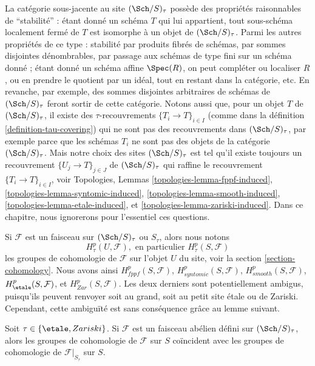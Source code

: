 \noindent
La cat\'egorie sous-jacente au site $(\Sch/S)_\tau$ poss\`ede des propri\'et\'es
raisonnables de ``stabilit\'e'' : \'etant donn\'e un sch\'ema $T$ qui lui appartient, tout sous-sch\'ema
localement ferm\'e de $T$ est isomorphe \`a un objet de $(\Sch/S)_\tau$.
Parmi les autres propri\'et\'es de ce type : stabilit\'e par produits fibr\'es de sch\'emas,
par sommes disjointes d\'enombrables,
par passage aux sch\'emas de type fini sur un sch\'ema donn\'e ; \'etant donn\'e un sch\'ema affine
$\Spec(R)$, on peut compl\'eter ou localiser $R$, ou en prendre le quotient
par un id\'eal, tout en restant dans la cat\'egorie, etc.
En revanche, par exemple, des sommes disjointes arbitraires
de sch\'emas de $(\Sch/S)_\tau$ feront sortir de cette cat\'egorie.
Notons aussi que, pour un objet $T$ de $(\Sch/S)_\tau$, il existe des
$\tau$-recouvrements $\{T_i \to T\}_{i \in I}$ (comme dans la
d\'efinition \ref{definition-tau-covering})
qui ne sont pas des recouvrements dans $(\Sch/S)_\tau$, par exemple
parce que les sch\'emas $T_i$ ne sont pas des objets de la cat\'egorie
$(\Sch/S)_\tau$. Mais notre choix des sites $(\Sch/S)_\tau$
est tel qu'il existe toujours
un recouvrement $\{U_j \to T\}_{j \in J}$ de $(\Sch/S)_\tau$ qui raffine
le recouvrement $\{T_i \to T\}_{i \in I}$, voir
Topologies, Lemmas
\ref{topologies-lemma-fppf-induced},
\ref{topologies-lemma-syntomic-induced},
\ref{topologies-lemma-smooth-induced},
\ref{topologies-lemma-etale-induced}, et
\ref{topologies-lemma-zariski-induced}.
Dans ce chapitre, nous ignorerons pour l'essentiel ces questions.

\medskip\noindent
Si $\mathcal{F}$ est un faisceau sur $(\Sch/S)_\tau$ ou $S_\tau$, alors
nous notons
$$
H^p_\tau(U, \mathcal{F}), \text{ en particulier }
H^p_\tau(S, \mathcal{F})
$$
les groupes de cohomologie de $\mathcal{F}$ sur l'objet $U$ du site, voir
la section \ref{section-cohomology}. Nous avons ainsi
$H^p_{fppf}(S, \mathcal{F})$,
$H^p_{syntomic}(S, \mathcal{F})$,
$H^p_{smooth}(S, \mathcal{F})$,
$H^p_\etale(S, \mathcal{F})$, et
$H^p_{Zar}(S, \mathcal{F})$. Les deux derniers sont potentiellement ambigus, puisqu'ils
peuvent renvoyer soit au grand, soit au petit site \'etale ou de Zariski. Cependant,
cette ambigu\"it\'e est sans cons\'equence gr\^ace au lemme suivant.

\begin{lemma}
\label{lemma-compare-cohomology-big-small}
Soit $\tau \in \{\etale, Zariski\}$.
Si $\mathcal{F}$ est un faisceau ab\'elien d\'efini sur
$(\Sch/S)_\tau$, alors
les groupes de cohomologie de $\mathcal{F}$ sur $S$ co\"incident avec les groupes de cohomologie
de $\mathcal{F}|_{S_\tau}$ sur $S$.
\end{lemma}

